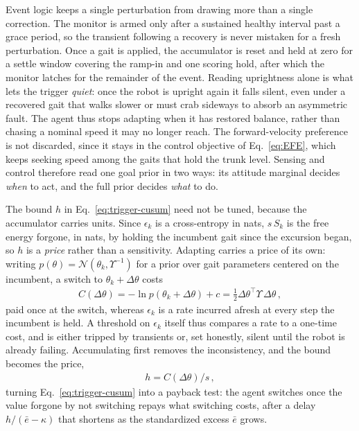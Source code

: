 \documentclass[letterpaper, 10 pt, conference]{ieeeconf}  %
\newcommand{\cN}{\mathcal{N}}
\begin{document}
Event logic keeps a single perturbation from drawing more than a single correction.
The monitor is armed only after a sustained healthy interval past a grace period, so the transient following a recovery is never mistaken for a fresh perturbation.
Once a gait is applied, the accumulator is reset and held at zero for a settle window covering the ramp-in and one scoring hold, after which the monitor latches for the remainder of the event.
Reading uprightness alone is what lets the trigger \emph{quiet}: once the robot is upright again it falls silent, even under a recovered gait that walks slower or must crab sideways to absorb an asymmetric fault.
The agent thus stops adapting when it has restored balance, rather than chasing a nominal speed it may no longer reach.
The forward-velocity preference is not discarded, since it stays in the control objective of Eq.~\ref{eq:EFE}, which keeps seeking speed among the gaits that hold the trunk level.
Sensing and control therefore read one goal prior in two ways: its attitude marginal decides \emph{when} to act, and the full prior decides \emph{what} to do.


The bound $h$ in Eq.~\ref{eq:trigger-cusum} need not be tuned, because the accumulator carries units.
Since $\epsilon_k$ is a cross-entropy in nats, $s\,S_k$ is the free energy forgone, in nats, by holding the incumbent gait since the excursion began, so $h$ is a \emph{price} rather than a sensitivity.
Adapting carries a price of its own: writing $p(\theta) = \cN(\theta_k, \Upsilon^{-1})$ for a prior over gait parameters centered on the incumbent, a switch to $\theta_k + \Delta\theta$ costs
\begin{align} \label{eq:switch-cost}
    C(\Delta\theta) = -\ln p(\theta_k + \Delta\theta) + c = \tfrac{1}{2}\Delta\theta^{\top}\Upsilon\,\Delta\theta \,,
\end{align}
paid once at the switch, whereas $\epsilon_k$ is a rate incurred afresh at every step the incumbent is held.
A threshold on $\epsilon_k$ itself thus compares a rate to a one-time cost, and is either tripped by transients or, set honestly, silent until the robot is already failing.
Accumulating first removes the inconsistency, and the bound becomes the price,
\begin{align} \label{eq:threshold}
    h = C(\Delta\theta)/s \,,
\end{align}
turning Eq.~\ref{eq:trigger-cusum} into a payback test: the agent switches once the value forgone by not switching repays what switching costs, after a delay $h/(\bar{e}-\kappa)$ that shortens as the standardized excess $\bar{e}$ grows.
\end{document}
